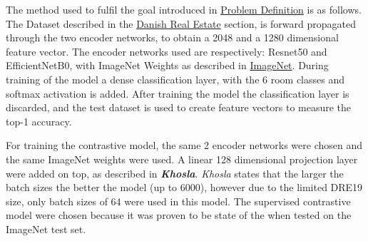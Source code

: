 The method used to fulfil the goal introduced in \hyperref[sec:Problem Definition]{Problem Definition} is as follows. The Dataset described in the \hyperref[sec:DRE19]{Danish Real Estate} section, is forward propagated through the two encoder networks, to obtain a 2048 and a 1280 dimensional feature vector. The encoder networks used are respectively: Resnet50\autocite{ResNet2015} and EfficientNetB0\autocite{tan2020efficientnet}, with ImageNet Weights as described in \hyperref[sec:ImageNet]{ImageNet}. During training of the model a dense classification layer, with the 6 room classes and softmax activation is added. After training the model the classification layer is discarded, and the test dataset is used to create feature vectors to measure the top-1 accuracy.

For training the contrastive model, the same 2 encoder networks were chosen and the same ImageNet weights were used. A linear 128 dimensional projection layer were added on top, as described in \textbf{\textit{Khosla}}\autocite{khosla2020supervised}. \textit{Khosla} states that the larger the batch sizes the better the model (up to 6000), however due to the limited DRE19 size, only batch sizes of 64 were used in this model. The supervised contrastive model were chosen because it was proven to be state of the when tested on the ImageNet test set.


